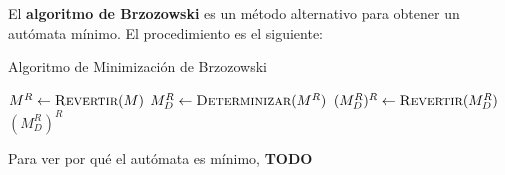 El \textbf{algoritmo de Brzozowski} es un método alternativo para obtener un autómata mínimo. El procedimiento es el siguiente:

\begin{algorithm}[H]
    \caption{Algoritmo de Minimización de Brzozowski}
    \label{minimizacion-brzozowski}
    \begin{algorithmic}[1]
        \State $M^R \gets \textsc{Revertir}(M)$
        \State $M^R_D \gets \textsc{Determinizar}(M^R)$
        \State $(M^R_D)^R \gets \textsc{Revertir}(M^R_D)$
        \State \Return $(M^R_D)^R$
        \EndProcedure
    \end{algorithmic}
\end{algorithm}

Para ver por qué el autómata es mínimo, \textbf{TODO}
